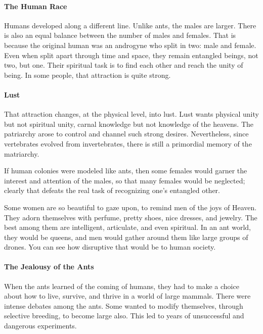 \paragraph{The Human Race}


Humans developed along a different line. Unlike ants, the males are larger. There is also an equal balance between the number of males and females. That is because the original human was an androgyne who split in two: male and female. Even when split apart through time and space, they remain entangled beings, not two, but one. Their spiritual task is to find each other and reach the unity of being. In some people, that attraction is quite strong.

\paragraph{Lust}


That attraction changes, at the physical level, into lust. Lust wants physical unity but not spiritual unity, carnal knowledge but not knowledge of the heavens. The patriarchy arose to control and channel such strong desires. Nevertheless, since vertebrates evolved from invertebrates, there is still a primordial memory of the matriarchy.

If human colonies were modeled like ants, then some females would garner the interest and attention of the males, so that many females would be neglected; clearly that defeats the real task of recognizing one's entangled other.

Some women are so beautiful to gaze upon, to remind men of the joys of Heaven. They adorn themselves with perfume, pretty shoes, nice dresses, and jewelry. The best among them are intelligent, articulate, and even spiritual. In an ant world, they would be queens, and men would gather around them like large groups of drones. You can see how disruptive that would be to human society.

\paragraph{The Jealousy of the Ants}


When the ants learned of the coming of humans, they had to make a choice about how to live, survive, and thrive in a world of large mammals. There were intense debates among the ants. Some wanted to modify themselves, through selective breeding, to become large also. This led to years of unsuccessful and dangerous experiments.

